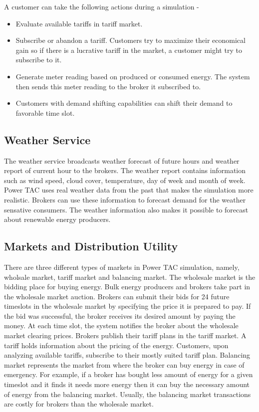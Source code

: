 A customer can take the following actions during a simulation - 
\begin{itemize}  
\item Evaluate available tariffs in tariff market.
\item Subscribe or abandon a tariff. Customers try to maximize their economical gain so if there is a lucrative tariff in the market, a customer might try to subscribe to it.
\item Generate meter reading based on produced or consumed energy. The system then sends this meter reading to the broker it subscribed to. 
\item Customers with demand shifting capabilities can shift their demand to favorable time slot.
\end{itemize}
 

\subsection{Weather Service}
The weather service broadcasts weather forecast of future hours and weather report of current hour to the brokers. The weather report contains information such as wind speed, cloud cover, temperature, day of week and month of week. Power TAC uses real weather data from the past that makes the simulation more realistic. Brokers can use these information to forecast demand for the weather sensative consumers. The weather information also makes it possible to forecast about renewable energy producers.

\subsection{Markets and Distribution Utility}

There are three different types of markets in Power TAC simulation, namely, wholsale market, tariff market and balancing market. The wholesale market is the bidding place for buying energy. Bulk energy producers and brokers take part in the wholesale market auction. Brokers can submit their bids for 24 future timeslots in the wholesale market by specifying the price it is prepared to pay. If the bid was successful, the broker receives its desired amount by paying the money. At each time slot, the system notifies the broker about the wholesale market clearing prices. Brokers publish their tariff plans in the tariff market. A tariff holds information about the pricing of the energy. Customers, upon analyzing available tariffs, subscribe to their mostly suited tariff plan. Balancing market represents the market from where the broker can buy energy in case of emergency. For example, if a broker has bought less amount of energy for a given timeslot and it finds it needs more energy then it can buy the necessary amount of energy from the balancing market. Usually, the balancing market transactions are costly for brokers than the wholesale market.

